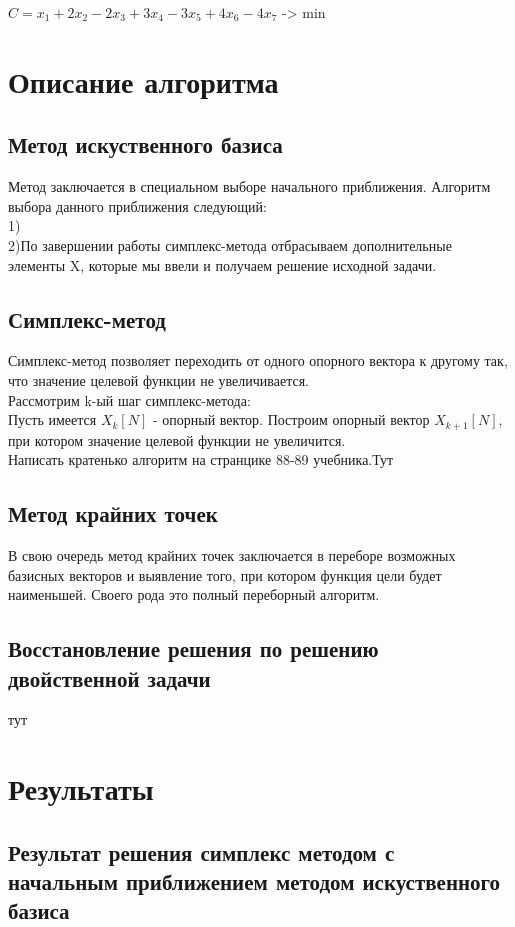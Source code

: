\documentclass[a4]{article}
\begin{document}
		\begin{center}
			$C = x_1 + 2x_2 - 2x_3 + 3x_4  - 3x_5 + 4x_6 - 4x_7$ -> min
		\end{center}
	\section{Описание алгоритма}
		\subsection{Метод искуственного базиса}
			Метод заключается в специальном выборе начального приближения. Алгоритм выбора данного приближения следующий:\\
			1)\\
			2)По завершении работы симплекс-метода отбрасываем дополнительные элементы X, которые мы ввели и получаем решение исходной задачи.
		\subsection{Симплекс-метод}
			Симплекс-метод позволяет переходить от одного опорного вектора к другому так, что значение целевой функции не увеличивается.\\
			Рассмотрим k-ый шаг симплекс-метода:\\
			Пусть имеется $X_k[N]$ - опорный вектор. Построим опорный вектор $X_{k + 1}[N]$, при котором значение целевой функции не увеличится.\\
			Написать кратенько алгоритм на странцике 88-89 учебника.Тут
			
		\subsection{Метод крайних точек}
			В свою очередь метод крайних точек заключается в переборе возможных базисных векторов и выявление того, при котором функция цели будет наименьшей. Своего рода это полный переборный алгоритм.
		
		\subsection{Восстановление решения по решению двойственной задачи}
			тут
	\section{Результаты}
		\subsection{Результат решения симплекс методом с начальным приближением методом искуственного базиса}
\end{document}

